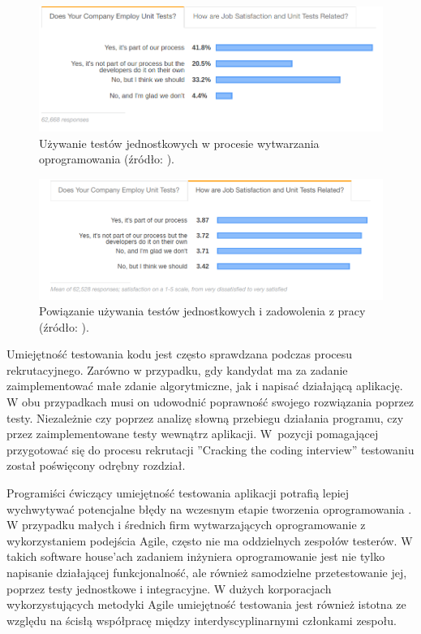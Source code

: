 \begin{figure}[h]
    \centering
    \includegraphics[width = 13cm]{chapter02/unit-tests-use.png}
    \caption{Używanie testów jednostkowych w procesie wytwarzania oprogramowania (źródło: \cite{stack-overflow-survey}).}
    \label{fig:unit-tests-use}
\end{figure}

\begin{figure}[h]
    \centering
    \includegraphics[width = 13cm]{chapter02/unit-tests-satisfaction.png}
    \caption{Powiązanie używania testów jednostkowych i zadowolenia z pracy (źródło: \cite{stack-overflow-survey}).}
    \label{fig:unit-tests-satisfaction}
\end{figure}

Umiejętność testowania kodu jest często sprawdzana podczas procesu rekrutacyjnego.
Zarówno w przypadku, gdy kandydat ma za zadanie zaimplementować małe zdanie algorytmiczne, jak i napisać działającą aplikację.
W obu przypadkach musi on udowodnić poprawność swojego rozwiązania poprzez testy. 
Niezależnie czy poprzez analizę słowną przebiegu działania programu, czy przez zaimplementowane testy wewnątrz aplikacji.
W~pozycji pomagającej przygotować się do procesu rekrutacji ”Cracking the coding interview” \cite{cracking-the-coding-interview} testowaniu został poświęcony odrębny rozdział.

Programiści ćwiczący umiejętność testowania aplikacji potrafią lepiej wychwytywać potencjalne błędy na wczesnym etapie tworzenia oprogramowania \cite{testing-better-error-catch}.
W przypadku małych i średnich firm wytwarzających oprogramowanie z wykorzystaniem podejścia Agile, często nie ma oddzielnych zespołów testerów.
W takich software house'ach zadaniem inżyniera oprogramowanie jest nie tylko napisanie działającej funkcjonalność, ale również samodzielne przetestowanie jej, poprzez testy jednostkowe i integracyjne.
W dużych korporacjach wykorzystujących metodyki Agile umiejętność testowania jest również istotna ze względu na ścisłą współpracę między interdyscyplinarnymi członkami zespołu.


